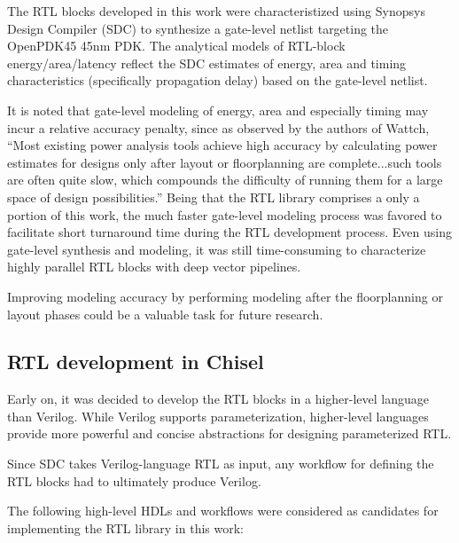 The RTL blocks developed in this work were characteristized using Synopsys Design Compiler (SDC) to synthesize a gate-level netlist targeting the OpenPDK45 45nm PDK. The analytical models of RTL-block energy/area/latency reflect the SDC estimates of energy, area and timing characteristics (specifically propagation delay) based on the gate-level netlist.

It is noted that gate-level modeling of energy, area and especially timing may incur a relative accuracy penalty, since as observed by the authors of Wattch\cite{wattch}, ``Most existing power analysis tools achieve high accuracy by calculating power estimates for designs only after layout or floorplanning are complete...such tools are often quite slow, which compounds the difficulty of running them for a large space of design possibilities.'' Being that the RTL library comprises a only a portion of this work, the much faster gate-level modeling process was favored to facilitate short turnaround time during the RTL development process. Even using gate-level synthesis and modeling, it was still time-consuming to characterize highly parallel RTL blocks with deep vector pipelines. 

Improving modeling accuracy by performing modeling after the floorplanning or layout phases could be a valuable task for future research.

\subsection{RTL development in Chisel}

Early on, it was decided to develop the RTL blocks in a higher-level language than Verilog. While Verilog supports parameterization, higher-level languages provide more powerful and concise abstractions for designing parameterized RTL. 

Since SDC takes Verilog-language RTL as input, any workflow for defining the RTL blocks had to ultimately produce Verilog.

The following high-level HDLs and workflows were considered as candidates for implementing the RTL library in this work:

